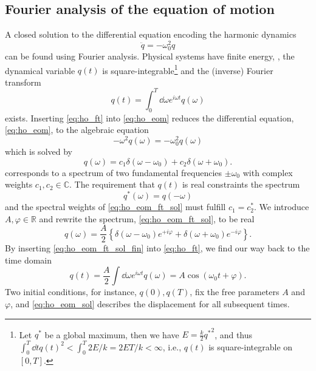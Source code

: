 \subsection{Fourier analysis of the equation of motion}

A closed solution to the differential equation encoding the harmonic dynamics
\begin{equation}
    \ddot{q}
    =
    -\omega_0^2q
    \label{eq:ho_eom}
\end{equation}
can be found using Fourier analysis.
Physical systems have finite energy, , the dynamical variable $q(t)$ is square-integrable\footnote{Let $q^*$ be a global maximum, then we have $E=\frac{k}{2}{q^*}^2$, and thus $\int_0^T\dd{t}q(t)^2<\int_0^T2E/k=2ET/k<\infty$, i.e., $q(t)$ is square-integrable on $[0,T]$.} and the (inverse) Fourier transform
\begin{equation}
    q(t)
    =
    \int_0^T\dd{\omega}e^{i\omega t}q(\omega)
    \label{eq:ho_ft}
\end{equation}
exists.
Inserting \cref{eq:ho_ft} into \cref{eq:ho_eom} reduces the differential equation, \cref{eq:ho_eom}, to the algebraic equation
\begin{equation}
    -\omega^2q(\omega)
    =-\omega_0^2q(\omega)
    \label{eq:ho_eom_ft}
\end{equation}
which is solved by
\begin{equation}
    q(\omega)
    =
    c_1\delta(\omega-\omega_0)
    +
    c_2\delta(\omega+\omega_0)
    \label{eq:ho_eom_ft_sol}.
\end{equation}
 corresponds to a spectrum of two fundamental frequencies $\pm\omega_0$ with complex weights $c_1,c_2\in\mathbb{C}$.
The requirement that $q(t)$ is real constraints the spectrum
\begin{equation}
    q^*(\omega)
    =
    q(-\omega)
\end{equation}
and the spectral weights of \cref{eq:ho_eom_ft_sol} must fulfill $c_1=c_2^*$.
We introduce $A,\varphi\in\mathbb{R}$ and rewrite the spectrum, \cref{eq:ho_eom_ft_sol}, to be real
\begin{equation}
    q(\omega)
    =
    \frac{A}{2}
    \left\{
    \delta(\omega-\omega_0)e^{+i\varphi}
    +
    \delta(\omega+\omega_0)e^{-i\varphi}
    \right\}
    \label{eq:ho_eom_ft_sol_fin}.
\end{equation}
By inserting \cref{eq:ho_eom_ft_sol_fin} into \cref{eq:ho_ft}, we find our way back to the time domain
\begin{equation}
    q(t)
    =
    \frac{A}{2}
    \int\dd{\omega}e^{i\omega t}q(\omega)
    =
    A\cos(\omega_0t+\varphi)
    \label{eq:ho_eom_sol}.
\end{equation}
Two initial conditions, for instance, $q(0),q(T)$, fix the free parameters $A$ and $\varphi$, and \cref{eq:ho_eom_sol} describes the displacement for all subsequent times.

